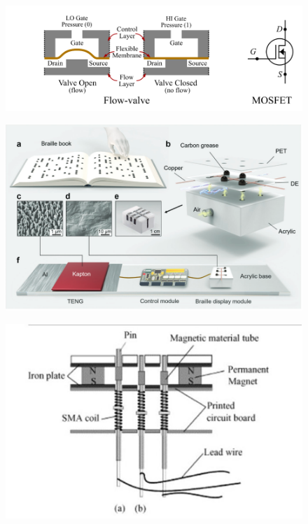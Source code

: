 \begin{figure}\centering
    \includegraphics[width=\textwidth]{figures/pneumatic-schema.png}
\caption{}
\label{fig:pneumatic-schema}
\end{figure}

\begin{figure}\centering
    \includegraphics[width=\textwidth]{figures/teng.png}
\caption{}
\label{fig:teng.png}
\end{figure}

\begin{figure}[h]
\centering
    \includegraphics[width=\textwidth]{figures/sma-coil.png}
\caption{}
\label{fig:sma-coil.png}
\end{figure}

